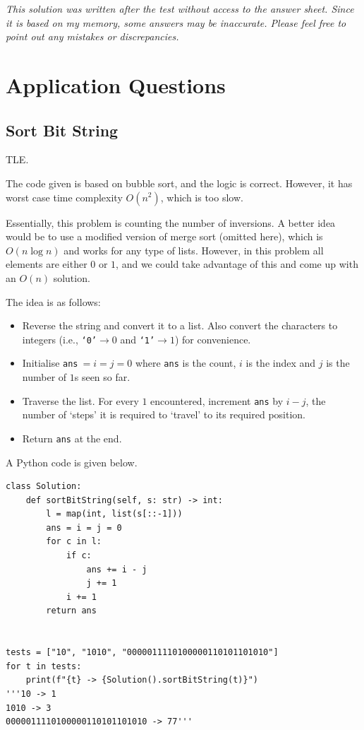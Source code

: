 \documentclass[12pt]{article}
\renewcommand{\t}{\texttt}
\begin{document}
\setcounter{section}{1}
\textit{This solution was written after the test without access to the answer sheet. Since it is based on my memory, some answers may be inaccurate. Please feel free to point out any mistakes or discrepancies.}
\section{Application Questions}
\subsection{Sort Bit String}
TLE.

The code given is based on bubble sort, and the logic is correct. However, it has worst case time complexity $O(n^2)$, which is too slow.

Essentially, this problem is counting the number of inversions. A better idea would be to use a modified version of merge sort (omitted here), which is $O(n\log n)$ and works for any type of lists. However, in this problem all elements are either $0$ or $1$, and we could take advantage of this and come up with an $O(n)$ solution.

The idea is as follows:
\begin{itemize}
\item Reverse the string and convert it to a list. Also convert the characters to integers (i.e., \t{`0'}$\to0$ and \t{`1'}$\to1$) for convenience.
\item Initialise \t{ans}$\ = i = j = 0$ where \t{ans} is the count, $i$ is the index and $j$ is the number of $1$s seen so far.
\item Traverse the list. For every $1$ encountered, increment \t{ans} by $i-j$, the number of `steps' it is required to `travel' to its required position.
\item Return \t{ans} at the end.
\end{itemize}

A Python code is given below.
\begin{verbatim}
class Solution:
    def sortBitString(self, s: str) -> int:
        l = map(int, list(s[::-1]))
        ans = i = j = 0
        for c in l:
            if c:
                ans += i - j
                j += 1
            i += 1
        return ans


tests = ["10", "1010", "0000011110100000110101101010"]
for t in tests:
    print(f"{t} -> {Solution().sortBitString(t)}")
'''10 -> 1
1010 -> 3
0000011110100000110101101010 -> 77'''
\end{verbatim}
\end{document}
